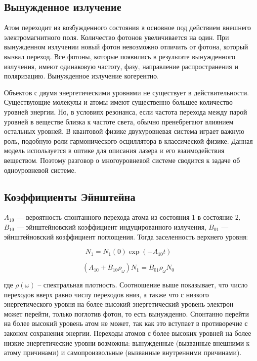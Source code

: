 \subsection{Вынужденное излучение}

Атом переходит из возбужденного состояния в основное под действием внешнего электромагнитного поля. Количество фотонов увеличивается на один. При вынужденном излучении новый фотон невозможно отличить от фотона, который вызвал переход. Все фотоны, которые появились в результате вынужденного излучения, имеют одинаковую частоту, фазу, направление распространения и поляризацию. Вынужденное излучение когерентно.


Объектов с двумя энергетическими уровнями не существует в действительности. Существующие молекулы и атомы имеют существенно большее количество уровней энергии. Но, в условиях резонанса, если частота перехода между парой уровней в веществе близка к частоте света, обычно пренебрегают влиянием остальных уровней. В квантовой физике двухуровневая система играет важную роль, подобную роли гармонического осциллятора в классической физике. Данная модель используется в оптике для описания лазера и его взаимодействия веществом. Поэтому разговор о многоуровневой системе сводится к задаче об одноуровневой системе.

\subsection{Коэффициенты Эйнштейна}
$A_{10}$ --- вероятность спонтанного перехода атома из состояния 1 в состояние 2, $B_{10}$ ---  эйнштейновский коэффициент индуцированного излучения, $B_{01}$ --- эйнштейновский коэффициент поглощения. Тогда заселенность верхнего уровня:

\begin{equation*}
	N_1 = N_1(0)\exp(-A_{10}t)
\end{equation*}

\begin{equation*}
\left(A_{10}+B_{10} \rho_{\omega}\right) N_{1}=B_{01} \rho_{\omega} N_{0}
\end{equation*}

где $\rho(\omega)$ -- спектральная плотность. Соотношение выше показывает, что число переходов вверх равно числу переходов вниз, а также что с низкого энергетического уровня на более высокий энергетический уровень электрон может перейти, только поглотив фотон, то есть вынужденно. Спонтанно перейти на более высокий уровень атом не может, так как это вступает в противоречие с законом сохранения энергии. Переходы атомов с более высоких уровней на более низкие энергетические уровни возможны: вынужденные (вызванные внешними к атому причинами) и самопроизвольные (вызванные внутренними причинами).

